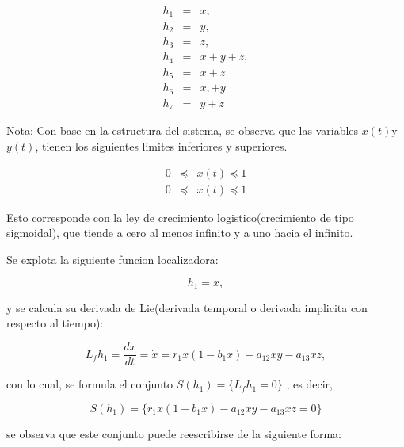 \documentclass[letterpaper,11pt]{article}
\begin{document}
\begin{eqnarray*}
h_{1} &=&x, \\
h_{2} &=&y, \\
h_{3} &=&z, \\
h_{4} &=&x+y+z, \\
h_{5} &=&x+z \\
h_{6} &=&x,+y \\
h_{7} &=&y+z
\end{eqnarray*}

\bigskip

Nota: Con base en la estructura del sistema, se observa que las variables $%
x(t)$y $y(t)$, tienen los siguientes limites inferiores y superiores.

\bigskip

\begin{eqnarray*}
0 &\preceq &x\left( t\right) \preceq 1 \\
0 &\preceq &x\left( t\right) \preceq 1
\end{eqnarray*}

\bigskip

Esto corresponde con la ley de crecimiento logistico(crecimiento de tipo
sigmoidal), que tiende a cero al menos infinito y a uno hacia el infinito.

Se explota la siguiente funcion localizadora:

\begin{equation*}
h_{1}=x,
\end{equation*}

\bigskip

y se calcula su derivada de Lie(derivada temporal o derivada implicita con
respecto al tiempo):

\bigskip

\begin{equation*}
L_{f}h_{1}=\frac{dx}{dt}=\dot{x}=r_{1}x\left( 1-b_{1}x\right)
-a_{12}xy-a_{13}xz,
\end{equation*}

con lo cual, se formula el conjunto $S\left( h_{1}\right) =\{L_{f}h_{1}=0\}$%
, es decir,

\bigskip

\begin{equation*}
S\left( h_{1}\right) =\{r_{1}x\left( 1-b_{1}x\right) -a_{12}xy-a_{13}xz=0\}
\end{equation*}

se observa que este conjunto puede reescribirse de la siguiente forma:

\bigskip
\end{document}
